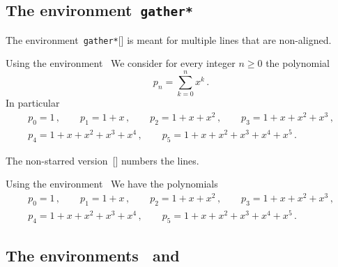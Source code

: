 \subsection{The environment~\texttt{gather*}}

The environment~\texttt{gather*}[\envname] is meant for multiple lines that are non-aligned.
\begin{showlatex}{Using the environment~}
We consider for every integer $n \geq 0$ the polynomial
\[
  p_n
  =
  \sum_{k=0}^n x^k \,.
\]
In particular
\begin{gather*}
  p_0 = 1 \,,
  \qquad
  p_1 = 1 + x \,,
  \qquad
  p_2 = 1 + x + x^2 \,,
  \qquad
  p_3 = 1 + x + x^2 + x^3 \,,
  \\
  p_4 = 1 + x + x^2 + x^3 + x^4 \,,
  \qquad
  p_5 = 1 + x + x^2 + x^3 + x^4 + x^5 \,.
\end{gather*}
\end{showlatex}
The non-starred version~[\envname] numbers the lines.
\begin{showlatex}{Using the environment~}
We have the polynomials
\begin{gather}
  p_0 = 1 \,,
  \qquad
  p_1 = 1 + x \,,
  \qquad
  p_2 = 1 + x + x^2 \,,
  \qquad
  p_3 = 1 + x + x^2 + x^3 \,,
  \\
  p_4 = 1 + x + x^2 + x^3 + x^4 \,,
  \qquad
  p_5 = 1 + x + x^2 + x^3 + x^4 + x^5 \,.
\end{gather}
\end{showlatex}



\subsection{The environments~ and }


